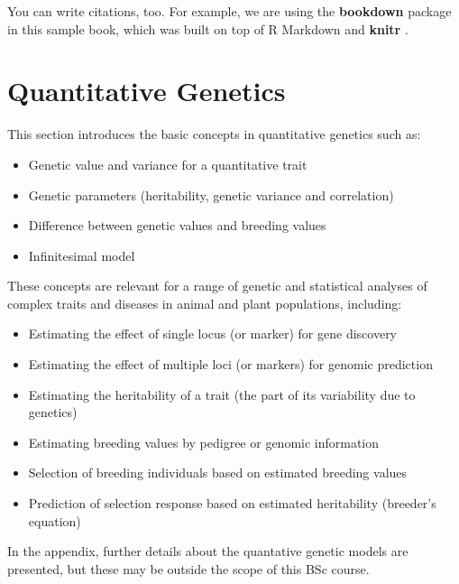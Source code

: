 \documentclass[
]{book}
\providecommand{\tightlist}{%
  \setlength{\itemsep}{0pt}\setlength{\parskip}{0pt}}
\begin{document}
You can write citations, too. For example, we are using the \textbf{bookdown} package \citep{R-bookdown} in this sample book, which was built on top of R Markdown and \textbf{knitr} \citep{xie2015}.

\hypertarget{quantitative-genetics}{%
\chapter{Quantitative Genetics}\label{quantitative-genetics}}

This section introduces the basic concepts in quantitative genetics such as:

\begin{itemize}
\tightlist
\item
  Genetic value and variance for a quantitative trait
\item
  Genetic parameters (heritability, genetic variance and correlation)
\item
  Difference between genetic values and breeding values
\item
  Infinitesimal model
\end{itemize}

These concepts are relevant for a range of genetic and statistical analyses of complex traits and diseases in animal and plant populations, including:

\begin{itemize}
\tightlist
\item
  Estimating the effect of single locus (or marker) for gene discovery
\item
  Estimating the effect of multiple loci (or markers) for genomic prediction
\item
  Estimating the heritability of a trait (the part of its variability due to genetics)
\item
  Estimating breeding values by pedigree or genomic information
\item
  Selection of breeding individuals based on estimated breeding values
\item
  Prediction of selection response based on estimated heritability (breeder's equation)
\end{itemize}

In the appendix, further details about the quantative genetic models are presented, but these may be outside the scope of this BSc course.
\end{document}
